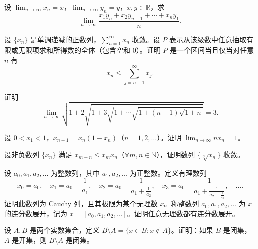 \noindent\begin{minipage}{\textwidth}
设 $\lim_{n\to\infty}x_n=x$，$\lim_{n\to\infty}y_n=y$，$x,y\in\mathbb R$，求\[\lim_{n\to\infty}\frac{x_1y_n+x_2y_{n-1}+\cdots+x_ny_1}{n}.\]
\end{minipage}\par\vfill
\noindent\begin{minipage}{\textwidth}
设 $\{x_n\}$ 是单调递减的正数列，$\sum_{n=1}^{\infty}x_n$ 收敛。设 $P$ 表示从该级数中任意抽取有限或无限项求和所得数的全体（包含空和 $0$）。证明 $P$ 是一个区间当且仅当对任意 $n$ 有\[x_n\le\sum_{j=n+1}^{\infty}x_j.\]
\end{minipage}\par\vfill
\noindent\begin{minipage}{\textwidth}
证明\[\lim_{n\to\infty}\sqrt{1+2\sqrt{1+3\sqrt{1+\cdots\sqrt{1+(n-1)\sqrt{1+n}}}}}=3.\]
\end{minipage}\par\vfill
\newpage
\noindent\begin{minipage}{\textwidth}
设 $0<x_1<1$，$x_{n+1}=x_n(1-x_n)$（$n=1,2,\ldots$）。证明 $\lim_{n\to\infty}nx_n=1$。
\end{minipage}\par\vfill
\noindent\begin{minipage}{\textwidth}
设非负数列 $\{x_n\}$ 满足 $x_{m+n}\le x_mx_n$（$\forall m,n\in\mathbb N$），证明数列 $\{\sqrt[n]{x_n}\}$ 收敛。
\end{minipage}\par\vfill
\noindent\begin{minipage}{\textwidth}
设 $a_0,a_1,a_2,\ldots$ 为整数列，其中 $a_1,a_2,\ldots$ 为正整数。定义有理数列\[x_0=a_0,\quad x_1=a_0+\frac1{a_1},\quad x_2=a_0+\frac1{a_1+\frac1{a_2}},\quad x_3=a_0+\frac1{a_1+\frac1{a_2+\frac1{a_3}}},\quad\ldots.\]证明此数列为 Cauchy 列，且其极限为某个无理数 $x$。称整数列 $a_0,a_1,a_2,\ldots$ 为 $x$ 的连分数展开，记为 $x=[a_0,a_1,a_2,\ldots]$。证明任意无理数都有连分数展开。
\end{minipage}\par\vfill
\noindent\begin{minipage}{\textwidth}
设 $A,B$ 是两个实数集合，定义 $B\setminus A=\{x\in B:x\notin A\}$。证明：如果 $B$ 是闭集，$A$ 是开集，则 $B\setminus A$ 是闭集。
\end{minipage}\par\vfill
